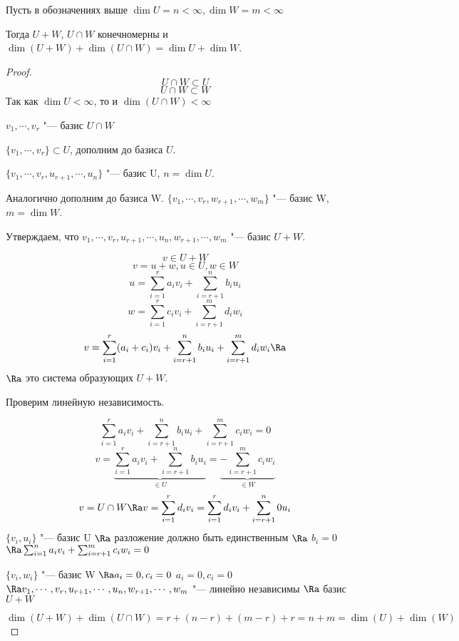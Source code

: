 \begin{theorem}
Пусть в обозначениях выше
$\dim U = n < \infty, \dim W = m < \infty$

Тогда $U + W$, $U \cap W$ конечномерны и 
$\dim(U + W) + \dim(U \cap W) = \dim U + \dim W$.
\end{theorem}
\begin{proof}
$$U \cap W \subset U$$
$$U \cap W \subset W$$
Так как $\dim U < \infty$, то  и $\dim (U \cap W) < \infty$

$v_1, \cdots, v_r$ "--- базис  $U \cap W$

$\{v_1, \cdots, v_r\} \subset U$, дополним до базиса $U$.

$\{v_1, \cdots, v_r, u_{r + 1}, \cdots, u_{n}\}$ "--- базис U, $n = \dim U$.

Аналогично дополним до базиса W.
$\{v_1, \cdots, v_r, w_{r + 1}, \cdots, w_{m}\}$ "--- базис W, $m = \dim W$.

Утверждаем, что $v_1, \cdots, v_r, u_{r + 1}, \cdots, u_n, w_{r + 1}, \cdots, w_{m}$ "--- базис $U + W$.

$$v \in U + W$$
$$v = u + w, u \in U, w \in W$$
$$u = \sum_{i = 1}^{r}a_iv_i + \sum_{i = r + 1}^{n}b_iu_i$$
$$w = \sum_{i = 1}^{r}c_iv_i + \sum_{i = r + 1}^{m}d_iw_i$$
$$v = \sum_{i = 1}^{r}(a_i + c_i)v_i + \sum_{i = r + 1}^{n}b_iu_i + \sum_{i = r + 1}^{m}d_iw_i \Ra$$
$\Ra$ это система образующих $U + W$.

Проверим линейную независимость. 

$$\sum_{i = 1}^{r}a_iv_i + \sum_{i = r + 1}^{n}b_iu_i + \sum_{i = r + 1}^{m}c_iw_i = 0$$
$$v = \underbrace{\sum_{i = 1}^{r}a_iv_i + \sum_{i = r + 1}^{n}b_iu_i}_{\in U} = \underbrace{-\sum_{i = r + 1}^{m}c_iw_i}_{\in W}$$
$$v = U \cap W \Ra v = \sum_{i = 1}^{r}d_iv_i = \sum_{i = 1}^{r}d_iv_i + \sum_{i = r + 1}^{n}0u_i$$
$\{v_i, u_i\}$ "--- базис U $\Ra$ разложение должно быть единственным $\Ra$ $b_i = 0$
$\Ra \sum_{i = 1}^{n}a_iv_i + \sum_{i = r + 1}^{m}c_iw_i = 0$

$\{v_i, w_i\}$ "--- базис W $\Ra a_i = 0, c_i = 0$
$a_i = 0, c_i = 0$
$\Ra v_1, \cdots, v_r, u_{r + 1}, \cdots, u_n, w_{r + 1}, \cdots, w_{m}$ "--- линейно независимы $\Ra$ базис $U + W$

$$\dim(U + W) + \dim(U \cap W) = r + (n - r) + (m  - r) + r = n + m = \dim(U) + \dim(W)$$
\end{proof}    